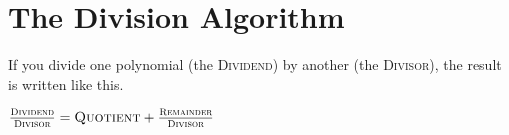 \section{The Division Algorithm}

If you divide one polynomial (the {\scshape Dividend}) 
by another (the {\scshape Divisor}),
the result is written like this. 

{
    \Large
    \begin{center}
    $ 
    \frac
        {\text{\scshape Dividend\rule[-0.2em]{0em}{0.2em}}}
        {\text{\scshape Divisor\rule{0em}{0.75em}}} 
    =
    \text{\scshape Quotient} 
        + 
        \frac
            {\text{\scshape Remainder\rule[-0.2em]{0em}{0.2em}}}
            {\text{\scshape Divisor\rule{0em}{0.75em}}} 
    $
    \end{center}
}



